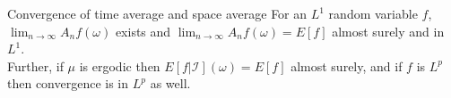 \begin{frame}{Convergence of time average and space average}
    For an $L^1$ random variable $f$, $\lim_{n\to\infty}A_nf(\omega)$ exists and $\lim_{n\to\infty}A_nf(\omega)=E[f]$ almost surely and in $L^1$.\\ \pause
    Further, if  $\mu$ is ergodic then $E[f|\mathcal I](\omega)=E[f]$ almost surely, and if $f$ is $L^p$ then convergence is in $L^p$ as well.
\end{frame}

